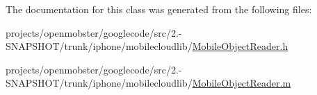 \-The documentation for this class was generated from the following files\-:\begin{DoxyCompactItemize}
\item 
projects/openmobster/googlecode/src/2.-\/\-S\-N\-A\-P\-S\-H\-O\-T/trunk/iphone/mobilecloudlib/\hyperlink{_mobile_object_reader_8h}{\-Mobile\-Object\-Reader.\-h}\item 
projects/openmobster/googlecode/src/2.-\/\-S\-N\-A\-P\-S\-H\-O\-T/trunk/iphone/mobilecloudlib/\hyperlink{_mobile_object_reader_8m}{\-Mobile\-Object\-Reader.\-m}\end{DoxyCompactItemize}
